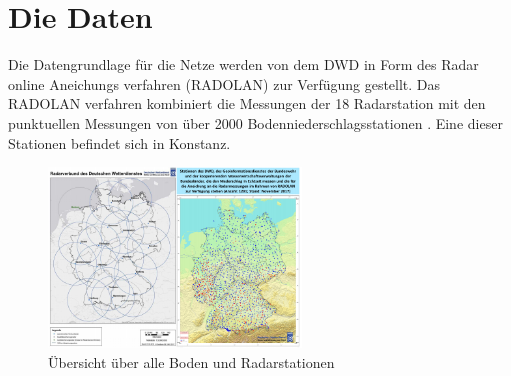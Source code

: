 \section{Die Daten}\label{die daten}
\begin{sloppypar}
    Die Datengrundlage für die Netze werden von dem DWD in Form des Radar online Aneichungs verfahren (RADOLAN) zur Verfügung gestellt. 
    Das RADOLAN verfahren kombiniert die Messungen der 18 Radarstation mit den punktuellen Messungen von über 2000 Bodenniederschlagsstationen \cite{dwdLeistungen}. 
    Eine dieser Stationen befindet sich in Konstanz.
\end{sloppypar}

\begin{figure}[htb]
 \centering
 \includegraphics[width=0.6\textwidth,angle=0]{abb/daten_stationsuebersicht}
 \caption[Stationen Übersicht]{Übersicht über alle Boden und Radarstationen}
\label{fig:daten_stationsuebersicht}
\end{figure}

